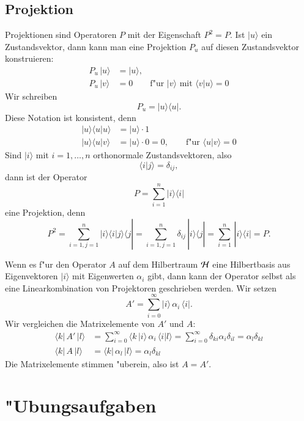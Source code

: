 \subsection{Projektion}
Projektionen sind Operatoren $P$ mit der Eigenschaft $P^2=P$.
Ist $|u\rangle$ ein Zustandsvektor, dann kann man eine Projektion $P_u$
auf diesen Zustandsvektor konstruieren:
\begin{align*}
P_u\,|u\rangle&=|u\rangle,\\
P_u\,|v\rangle&=0\qquad \text{f"ur $|v\rangle$ mit $\langle v|u\rangle=0$}
\end{align*}
Wir schreiben 
\[
P_u=
|u\rangle\langle u|
.
\]
Diese Notation ist konsistent, denn 
\begin{align*}
|u\rangle\langle u|u\rangle&=|u\rangle\cdot 1\\
|u\rangle\langle u|v\rangle&=|u\rangle\cdot 0=0,\qquad
\text{f"ur $\langle u|v\rangle = 0$}
\end{align*}
Sind $|i\rangle$ mit $i=1,\dots, n$ orthonormale Zustandsvektoren, also
\[
\langle i|j\rangle =\delta_{ij},
\]
dann ist der Operator
\[
P=\sum_{i=1}^n |i\rangle \langle i|
\]
eine Projektion, denn
\[
P^2=
\sum_{i=1, j = 1}^n
|i\rangle \langle i|j\rangle \langle j|
=
\sum_{i=1, j = 1}^n
\delta_{ij} \,|i\rangle\langle j|=\sum_{i=1}^n\,|i\rangle\langle i|=P.
\]

Wenn es f"ur den Operator $A$ auf dem Hilbertraum $\cal H$ eine
Hilbertbasis aus Eigenvektoren $|i\rangle$ mit Eigenwerten $\alpha_i$ gibt,
dann kann der Operator selbst
als eine Linearkombination von Projektoren geschrieben werden. Wir setzen
\[
A'=\sum_{i=0}^\infty |i\rangle \,\alpha_i\, \langle i|.
\]
Wir vergleichen die Matrixelemente von $A'$ und $A$:
\begin{align*}
\langle k|\, A' \,|l\rangle
&=
\sum_{i=0}^\infty \langle k\,|i\rangle\, \alpha_i \,\langle i|l\rangle
=\sum_{i=0}^\infty \delta_{ki}\alpha_i\delta_{il}
=\alpha_l\delta_{kl}
\\
\langle k|\,A\,|l\rangle
&=
\langle k|\,\alpha_l\,|l\rangle=\alpha_l\delta_{kl}
\end{align*}
Die Matrixelemente stimmen "uberein, also ist $A=A'$.

\section*{"Ubungsaufgaben}
\begin{uebungsaufgaben}
\item

\item

\item

\end{uebungsaufgaben}
